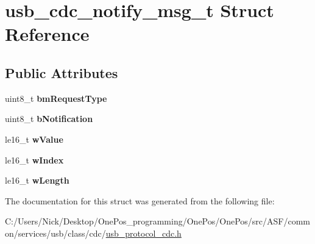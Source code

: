 \hypertarget{structusb__cdc__notify__msg__t}{\section{usb\-\_\-cdc\-\_\-notify\-\_\-msg\-\_\-t Struct Reference}
\label{structusb__cdc__notify__msg__t}
}
\subsection*{Public Attributes}
\begin{DoxyCompactItemize}
\item 
\hypertarget{structusb__cdc__notify__msg__t_a302292c741d73ddb118c034484b12e58}{uint8\-\_\-t {\bfseries bm\-Request\-Type}}\label{structusb__cdc__notify__msg__t_a302292c741d73ddb118c034484b12e58}

\item 
\hypertarget{structusb__cdc__notify__msg__t_a858771e881f30423359fd2500d8becd0}{uint8\-\_\-t {\bfseries b\-Notification}}\label{structusb__cdc__notify__msg__t_a858771e881f30423359fd2500d8becd0}

\item 
\hypertarget{structusb__cdc__notify__msg__t_a6e2257375ef68c47f07c8dc504f75268}{le16\-\_\-t {\bfseries w\-Value}}\label{structusb__cdc__notify__msg__t_a6e2257375ef68c47f07c8dc504f75268}

\item 
\hypertarget{structusb__cdc__notify__msg__t_ad4d5d5479a4600ae64f81812ba7cacc9}{le16\-\_\-t {\bfseries w\-Index}}\label{structusb__cdc__notify__msg__t_ad4d5d5479a4600ae64f81812ba7cacc9}

\item 
\hypertarget{structusb__cdc__notify__msg__t_aee9ecbc7f624ac837f027332b1580b93}{le16\-\_\-t {\bfseries w\-Length}}\label{structusb__cdc__notify__msg__t_aee9ecbc7f624ac837f027332b1580b93}

\end{DoxyCompactItemize}


The documentation for this struct was generated from the following file\-:\begin{DoxyCompactItemize}
\item 
C\-:/\-Users/\-Nick/\-Desktop/\-One\-Pos\-\_\-programming/\-One\-Pos/\-One\-Pos/src/\-A\-S\-F/common/services/usb/class/cdc/\hyperlink{usb__protocol__cdc_8h}{usb\-\_\-protocol\-\_\-cdc.\-h}\end{DoxyCompactItemize}
